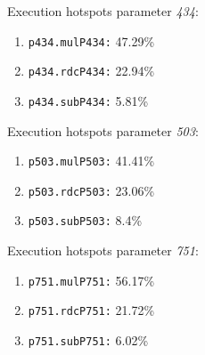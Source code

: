 Execution hotspots parameter \textit{434}:
\begin{enumerate}[noitemsep]
	\item \texttt{p434.mulP434:} 47.29\%
	\item \texttt{p434.rdcP434:} 22.94\%
	\item \texttt{p434.subP434:} 5.81\%
\end{enumerate}
Execution hotspots parameter \textit{503}:
\begin{enumerate}[noitemsep]
	\item \texttt{p503.mulP503:} 41.41\%
	\item \texttt{p503.rdcP503:} 23.06\%
	\item \texttt{p503.subP503:} 8.4\%
\end{enumerate}
Execution hotspots parameter \textit{751}:
\begin{enumerate}[noitemsep]
	\item \texttt{p751.mulP751:} 56.17\%
	\item \texttt{p751.rdcP751:} 21.72\%
	\item \texttt{p751.subP751:} 6.02\%
\end{enumerate}
